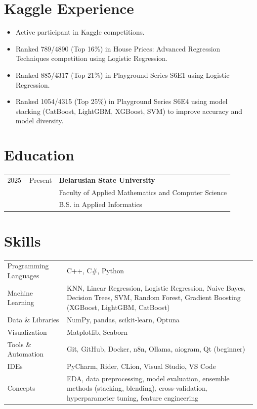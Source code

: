 \documentclass[a4paper,11pt]{article}
\begin{document}
\section{Kaggle Experience}
\begin{itemize}[leftmargin=1.2em, itemsep=2pt]
    \item Active participant in Kaggle competitions.
    \item Ranked 789/4890 (Top 16\%) in House Prices: Advanced Regression Techniques competition using Logistic Regression.
    \item Ranked 885/4317 (Top 21\%) in Playground Series S6E1 using Logistic Regression.
    \item Ranked 1054/4315 (Top 25\%) in Playground Series S6E4 using model stacking (CatBoost, LightGBM, XGBoost, SVM) to improve accuracy and model diversity.
\end{itemize}
\section{Education}
\begin{tabularx}{\linewidth}{@{}l X@{}}
2025 -- Present & 
\textbf{Belarusian State University} \\
& Faculty of Applied Mathematics and Computer Science \\
& B.S. in Applied Informatics \\
\end{tabularx}
\section{Skills}
\begin{tabularx}{\linewidth}{@{}l X@{}}
Programming Languages & C++, C\#, Python \\
Machine Learning & KNN, Linear Regression, Logistic Regression, Naive Bayes, Decision Trees, SVM, Random Forest, Gradient Boosting (XGBoost, LightGBM, CatBoost) \\
Data \& Libraries & NumPy, pandas, scikit-learn, Optuna \\
Visualization & Matplotlib, Seaborn \\
Tools \& Automation & Git, GitHub, Docker, n8n, Ollama, aiogram, Qt (beginner) \\
IDEs & PyCharm, Rider, CLion, Visual Studio, VS Code \\
Concepts & EDA, data preprocessing, model evaluation, ensemble methods (stacking, blending), cross-validation, hyperparameter tuning, feature engineering \\
\end{tabularx}
\end{document}

